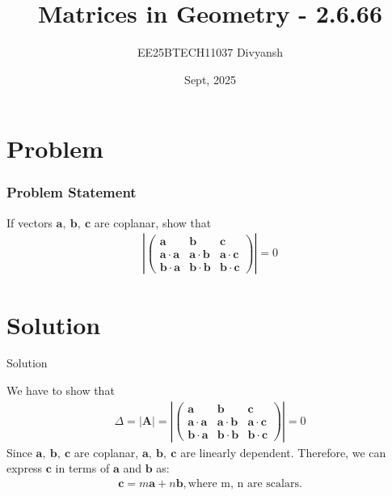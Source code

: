\documentclass{beamer}
\title{Matrices in Geometry - 2.6.66}
\author{EE25BTECH11037  Divyansh}
\date{Sept, 2025}
\let\vec\mathbf
\theoremstyle{remark}
\providecommand{\abs}[1]{\left\vert#1\right\vert}
\newcommand{\myvec}[1]{\ensuremath{\begin{pmatrix}#1\end{pmatrix}}}
\begin{document}
\maketitle


\section{Problem}
\begin{frame}
\frametitle{Problem Statement}
If vectors $\vec{a},\ \vec{b}, \ \vec{c}$ are coplanar, show that
\begin{align*}
\abs{\myvec{
\vec{a} & \vec{b} & \vec{c}\\
\vec{a}\cdot \vec{a} & \vec{a}\cdot \vec{b} & \vec{a}\cdot \vec{c} \\
\vec{b}\cdot \vec{a} & \vec{b}\cdot \vec{b} & \vec{b}\cdot \vec{c} 
}} = 0
\end{align*}
\end{frame}

\section{Solution}
\begin{frame}{Solution}
   
We have to show that 
\begin{align}
\Delta=\abs{\vec{A}} = \abs{\myvec{
\vec{a} & \vec{b} & \vec{c}\\
\vec{a}\cdot \vec{a} & \vec{a}\cdot \vec{b} & \vec{a}\cdot \vec{c} \\
\vec{b}\cdot \vec{a} & \vec{b}\cdot \vec{b} & \vec{b}\cdot \vec{c} 
}} =0
\end{align}
Since $\vec{a}, \ \vec{b}, \ \vec{c}$ are coplanar, $\vec{a}, \ \vec{b}, \ \vec{c}$ are linearly dependent. Therefore, we can express $\vec{c}$ in terms of $\vec{a}$ and $\vec{b}$ as:
\begin{align}
    \vec{c}=m\vec{a}+n\vec{b}, \text{where m, n are scalars.}
\end{align}
\end{frame}
\end{document}
